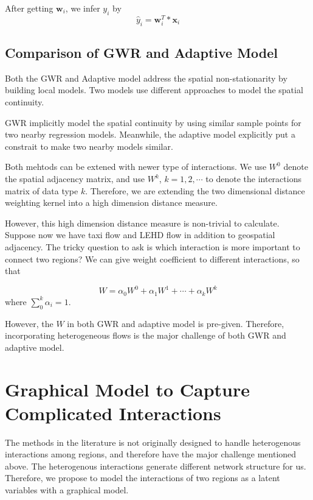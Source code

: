 After getting $\mathbf{w}_i$, we infer $y_i$ by
\begin{equation}
\hat{y}_i = \mathbf{w}_i^T * \mathbf{x}_i
\end{equation}




\subsection{Comparison of GWR and Adaptive Model}


Both the GWR and Adaptive model address the spatial non-stationarity by building local models. Two models use different approaches to model the spatial continuity.

GWR implicitly model the spatial continuity by using similar sample points for two nearby regression models. Meanwhile, the adaptive model explicitly put a constrait to make two nearby models similar.

Both mehtods can be extened with newer type of interactions. We use $W^0$ denote the spatial adjacency matrix, and use $W^k$, $k = 1,2, \cdots$ to denote the interactions matrix of data type $k$. Therefore, we are extending the two dimensional distance weighting kernel into a high dimension distance measure. 


However, this high dimension distance measure is non-trivial to calculate. Suppose now we have taxi flow and LEHD flow in addition to geospatial adjacency. The tricky question to ask is which interaction is more important to connect two regions? We can give weight coefficient to different interactions, so that

\begin{equation}
W =  \alpha_0 W^0 + \alpha_1 W^1 + \cdots  +\alpha_k W^k
\end{equation}
where $\sum_0^k \alpha_i = 1$.

However, the $W$ in both GWR and adaptive model is pre-given. Therefore, incorporating heterogeneous flows is the major challenge of both GWR and adaptive model.




\section{Graphical Model to Capture Complicated Interactions}



The methods in the literature is not originally designed to handle heterogenous interactions among regions, and therefore have the major challenge mentioned above. The heterogenous interactions generate different network structure for us.  Therefore, we propose to model the interactions of two regions as a latent variables with a graphical model. 




